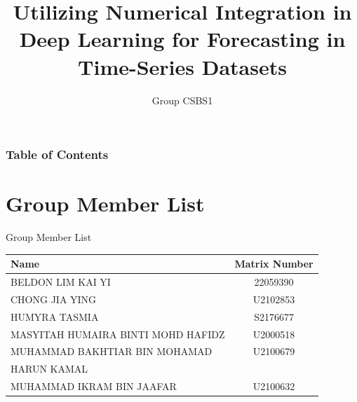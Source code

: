\documentclass[pt]{beamer}
\title[Utilizing Numerical Integration in Deep Learning for Forecasting in Time-Series Datasets]{Utilizing Numerical Integration in Deep Learning for Forecasting in Time-Series Datasets}
\subtitle{Group CSBS1}
\institute[WID3015 Numerical Analysis]{Supervisor: Dr Suzan J. Obaiys}
\date[Universiti Malaya]
\newenvironment{tres important}[2][]{
	\setkeys{EmphEqEnv}{#2}
	\setkeys{EmphEqOpt}{box={\setlength{\fboxsep}{10pt}\fcolorbox{myNewColorA}{white}},#1}
	\EmphEqMainEnv}
{\endEmphEqMainEnv}
\begin{document}
\begin{frame}
    \titlepage
\end{frame}

\begin{frame}
    \frametitle{Table of Contents}
    \tableofcontents
\end{frame}

\section{Group Member List}
\begin{frame}{Group Member List}
    \begin{table}
    \begin{center}
    \small
        \begin{tabular}{|l|c|}
            \hline
            \textbf{Name} & \textbf{Matrix Number} \\ \hline
            BELDON LIM KAI YI  & 22059390  \\ \hline
            CHONG JIA YING  & U2102853  \\ \hline
            HUMYRA TASMIA  & S2176677  \\ \hline
            MASYITAH HUMAIRA BINTI MOHD HAFIDZ  & U2000518  \\ \hline
            MUHAMMAD BAKHTIAR BIN MOHAMAD  & U2100679 \\
            HARUN KAMAL  &  \\ \hline
            MUHAMMAD IKRAM BIN JAAFAR  & U2100632  \\ \hline
        \end{tabular}
    \end{center}
    \end{table}
\end{frame}

\end{document}
